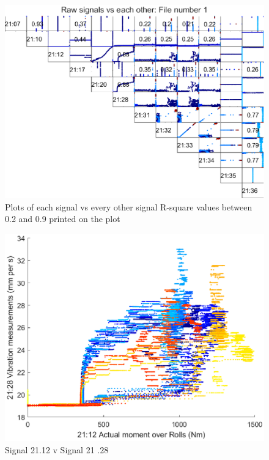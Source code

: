 \documentclass{article}
\begin{document}
\begin{figure}[H]
    \centering
    \includegraphics[width=\textwidth, height=\textheight, keepaspectratio]{figures/RawSignalCorrelationsFile1.eps}
    \caption{Plots of each signal vs every other signal R-square values between 0.2 and 0.9 printed on the plot}
    \label{fig:RawSignalCorrelationsFile1}
\end{figure}

\begin{figure}[H]
    \centering
    \includegraphics[width=\textwidth, height=\textheight, keepaspectratio]{figures/Signal21_12vSignal21_28.eps}
    \caption{Signal 21.12 v Signal 21 .28}
    \label{fig:Signal21_12vSignal21_28}
\end{figure}
\end{document}
